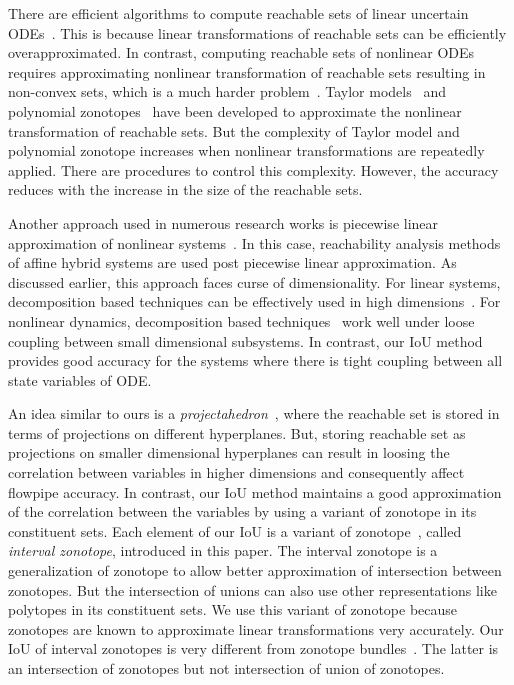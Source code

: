  There are efficient algorithms to compute reachable sets of linear
 uncertain
 ODEs~\cite{girard2005reachability,FLD+11,girard2008efficient,bak2017simulation}.
 This is because linear transformations of reachable sets can be
 efficiently overapproximated.  In contrast, computing reachable sets
 of nonlinear ODEs requires approximating nonlinear transformation of
 reachable sets resulting in non-convex sets, which is a much harder
 problem~\cite{dang2009image,monniaux2011generation}.  Taylor
 models~\cite{chen2012taylor} and polynomial
 zonotopes~\cite{althoff2013reachability,kochdumper2020sparse,kochdumper2020constrained}
 have been developed to approximate the nonlinear transformation of
 reachable sets.  But the complexity of Taylor model and polynomial
 zonotope increases when nonlinear transformations are repeatedly
 applied.  There are procedures to control this complexity. However,
 the accuracy reduces with the increase in the size of the reachable
 sets.

Another approach used in numerous research works is piecewise linear
approximation of nonlinear
systems~\cite{althoff2008reachability,li2020reachability,dang2010accurate,ramdani2009hybrid,han2006reachability,bak2016scalable}.
In this case, reachability analysis methods of affine hybrid systems
are used post piecewise linear approximation.  As discussed earlier,
this approach faces curse of dimensionality.  For linear systems,
decomposition based techniques can be effectively used in high
dimensions~\cite{bogomolov2018reach}.  For nonlinear dynamics,
decomposition based
techniques~\cite{chen2018decomposition,chen2016decomposed} work well
under loose coupling between small dimensional subsystems.  In
contrast, our IoU method provides good accuracy for the systems where there
is tight coupling between all state variables of ODE.

An idea similar to ours is a
\emph{projectahedron}~\cite{greenstreet1999reachability}, where the reachable
set is stored in terms of projections on different hyperplanes.  But,
storing reachable set as projections on smaller dimensional
hyperplanes can result in loosing the correlation between variables in
higher dimensions and consequently affect flowpipe accuracy.  In
contrast, our IoU method maintains a good approximation of the
correlation between the variables by using a variant of zonotope in
its constituent sets.
%
Each element of our IoU is a variant of
zonotope~\cite{girard2005reachability}, called \emph{interval
  zonotope}, introduced in this paper.  The interval zonotope is a
generalization of zonotope to allow better approximation of
intersection between zonotopes.  But the intersection of unions can
also use other representations like polytopes in its constituent sets.
We use this variant of zonotope because zonotopes are known to
approximate linear transformations very accurately.  Our IoU of
interval zonotopes is very different from zonotope
bundles~\cite{althoff2011zonotope}.  The latter is an intersection of
zonotopes but not intersection of union of zonotopes.

